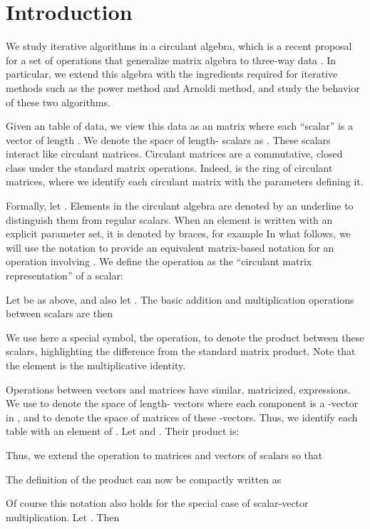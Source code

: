 \documentclass[1p,authoryear,letterpaper]{elsarticle}
\renewcommand{\cite}{\citep}
\begin{document}
\section{Introduction}



We study iterative algorithms in a circulant algebra, which is
a recent proposal for a set of operations that generalize matrix
algebra to three-way data \cite{kilmer2008-circ-tensor-svd}.
In particular, we extend this algebra
with the ingredients required for iterative methods such as the
power method and Arnoldi method, and study the behavior of
these two algorithms.



Given an  table of data, we view this data
as an  matrix where each ``scalar'' is a vector of
length .  We denote the space of length- scalars as .
These scalars interact like circulant matrices.
Circulant matrices are a commutative, closed class under the standard matrix operations.
Indeed,  is the ring of circulant matrices, where we
identify each circulant
matrix with the  parameters defining it.

Formally, let .
Elements in the circulant algebra are denoted by an underline to distinguish
them from regular scalars.  When an element is written with an explicit
parameter set, it is denoted by braces, for example  In what follows, we will use the notation  to provide an equivalent matrix-based notation for an operation involving .
We define the operation 
as the ``circulant matrix representation'' of a scalar:
				
Let  be as above, and also let  .
The basic addition  and multiplication operations between scalars are then

We use here a special symbol, the  operation, to denote the product between these scalars, highlighting the difference from the standard matrix product.
Note that the element
 is
the multiplicative identity.

Operations between vectors and matrices have similar, matricized, expressions. 
We use  to denote the space of length- vectors where each
component is a -vector in , and   to denote the space of  
matrices of these -vectors.  Thus, we identify each  table 
with an element of .  Let  and .  Their product is:

Thus, we extend the operation  to matrices and vectors of  scalars so that

The definition of the product can now be compactly written as

Of course this notation also holds for the special case of scalar-vector multiplication.  Let .  Then
\end{document}
